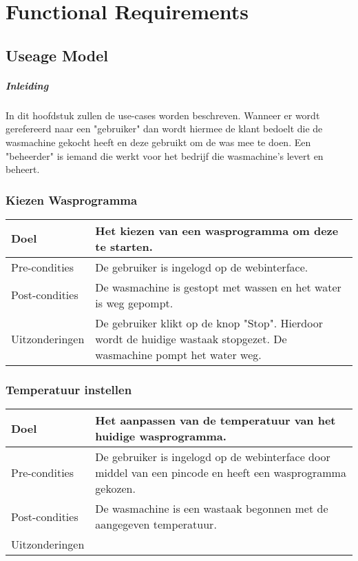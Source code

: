 \chapter{Functional Requirements}
\section{Useage Model}

\paragraph{Inleiding}
In dit hoofdstuk zullen de use-cases worden beschreven.
Wanneer er wordt gerefereerd naar een "gebruiker" dan wordt hiermee de klant bedoelt die de wasmachine gekocht heeft en deze gebruikt om de was mee te doen.
Een "beheerder" is iemand die werkt voor het bedrijf die wasmachine's levert en beheert.

\subsection{Kiezen Wasprogramma}
\begin{center}
  \begin{tabular}{ | p{4cm} | p{8.5cm} | }    \hline
    Doel & Het kiezen van een wasprogramma om deze te starten. \\ \hline
    Pre-condities & De gebruiker is ingelogd op de webinterface. \\ \hline
    Post-condities & De wasmachine is gestopt met wassen en het water is weg gepompt. \\ \hline
    Uitzonderingen & De gebruiker klikt op de knop "Stop". Hierdoor wordt de huidige wastaak stopgezet. De wasmachine pompt het water weg. \\
    \hline
  \end{tabular}
\end{center}

\subsection{Temperatuur instellen}
\begin{center}
  \begin{tabular}{ | p{4cm} | p{8.5cm} | }    \hline
    Doel & Het aanpassen van de temperatuur van het huidige wasprogramma. \\ \hline
    Pre-condities & De gebruiker is ingelogd op de webinterface door middel van een pincode en heeft een wasprogramma gekozen. \\ \hline
    Post-condities & De wasmachine is een wastaak begonnen met de aangegeven temperatuur. \\ \hline
    Uitzonderingen &  \\
    \hline
  \end{tabular}
\end{center}

